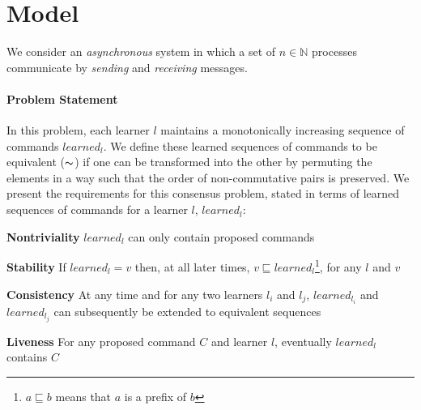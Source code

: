 \section{Model}
\label{sec:model}
%
We consider an \emph{asynchronous} system in which
a set of $n \in \mathbb{N}$ processes communicate by 
\emph{sending} and \emph{receiving} messages.

\paragraph{Problem Statement}
In this problem, each learner $l$ maintains a monotonically increasing sequence of commands $learned_l$. 
We define these learned sequences of commands to be equivalent ($\thicksim$) 
if one can be transformed into the other by permuting the elements in a way such that the order of non-commutative pairs is preserved. 
We present the requirements for this consensus problem, stated in terms of learned sequences of commands for a learner $l$, $learned_l$:\par
\textbf{Nontriviality} $learned_l$ can only contain proposed commands \par
\textbf{Stability} If $learned_l = v$ then, at all later times, $v \sqsubseteq learned_l$\footnote{$a \sqsubseteq b$ means that $a$ is a prefix of $b$}, for any $l$ and $v$ \par
\textbf{Consistency} At any time and for any two learners $l_i$ and $l_j$, $learned_{l_i}$ and $learned_{l_j}$ can subsequently be extended to equivalent sequences\par
\textbf{Liveness} For any proposed command $C$ and learner $l$, eventually $learned_l$ contains $C$ \par
